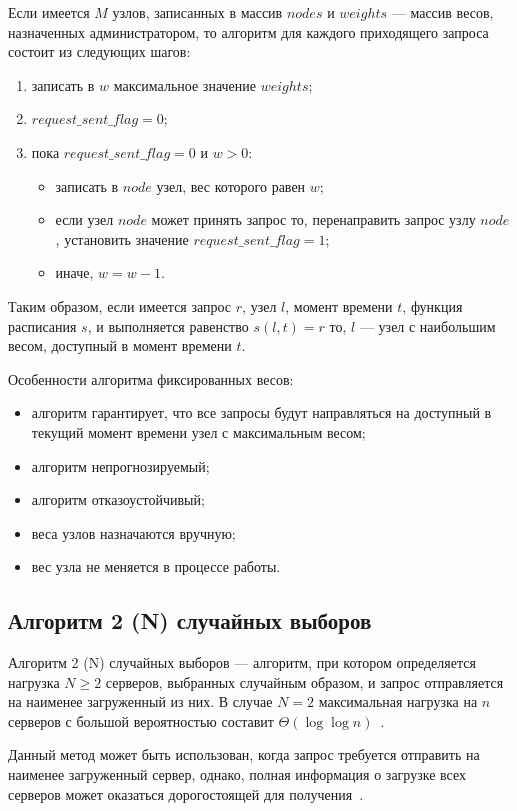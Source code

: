Если имеется $M$ узлов, записанных в массив $nodes$ и $weights$ --- массив весов, назначенных администратором, то алгоритм для каждого приходящего запроса состоит из следующих шагов:
\begin{enumerate}
	\item записать в $w$ максимальное значение $weights$;
	\item $request\_sent\_flag = 0$;
	\item пока $request\_sent\_flag = 0$ и $w > 0$:
	\begin{itemize}
		\item записать в $node$ узел, вес которого равен $w$;
		\item если узел $node$ может принять запрос то, перенаправить запрос узлу $node$, установить значение $request\_sent\_flag = 1$;
		\item иначе, $w = w - 1$.
	\end{itemize}
\end{enumerate}

Таким образом, если имеется запрос $r$, узел $l$, момент времени $t$, функция расписания $s$, и выполняется равенство $s(l, t) = r$ то, $l$ --- узел с наибольшим весом, доступный в момент времени $t$.

Особенности алгоритма фиксированных весов:
\begin{itemize}
	\item алгоритм гарантирует, что все запросы будут направляться на доступный в текущий момент времени узел с максимальным весом;
	\item алгоритм непрогнозируемый;
	\item алгоритм отказоустойчивый;
	\item веса узлов назначаются вручную;
	\item вес узла не меняется в процессе работы.
\end{itemize}

\subsection{Алгоритм 2 (N) случайных выборов}

Алгоритм 2 (N) случайных выборов --- алгоритм, при котором определяется нагрузка $N \ge 2$ серверов, выбранных случайным образом, и запрос отправляется на наименее загруженный из них. 
В случае $N=2$ максимальная нагрузка на $n$ серверов с большой вероятностью составит $\Theta(\log  \log n)$~\cite{pwr2choices}.

Данный метод может быть использован, когда запрос требуется отправить на наименее загруженный сервер, однако, полная информация о загрузке всех серверов может оказаться дорогостоящей для получения~\cite{pwr2choices}.

